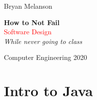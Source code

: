 \documentclass[11pt]{article}
\newcommand*{\plogo}{\fbox{$\mathcal{BM}$}}
\begin{document}
 
        
    \begin{titlepage}
    
        \raggedleft
        
        \vspace*{\baselineskip}
        
        {\Large Bryan Melanson}
        
        \vspace*{0.167\textheight}
        
        \textbf{\LARGE How to Not Fail}\\[\baselineskip]
        
        {\textcolor{Red}{\Huge Software Design}}\\[\baselineskip]
        
        {\Large \textit{While never going to class}}
        
        \vfill
        
        {\large Computer Engineering 2020 ~~\plogo}
        
        \vspace*{3\baselineskip}
    
    \end{titlepage}

    \pagebreak
    
\tableofcontents

\pagebreak

\section{Intro to Java}
\end{document}
